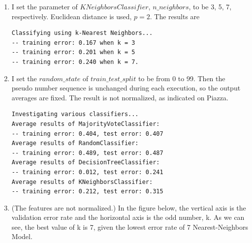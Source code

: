 \documentclass[11pt]{article}
\begin{document}
\begin{enumerate}[label=(\alph*)]
    \item
    I set the parameter of $KNeighborsClassifier$, $n\_neighbors$, to be 3, 5, 7, respectively. Euclidean distance is used, $p = 2$. The results are
    \begin{verbatim}
Classifying using k-Nearest Neighbors...
-- training error: 0.167 when k = 3
-- training error: 0.201 when k = 5
-- training error: 0.240 when k = 7.
    \end{verbatim}

    \item 
    I set the $random\_state$ of $train\_test\_split$ to be from 0 to 99. Then the pseudo number sequence is unchanged during each execution, so the output averages are fixed. The result is not normalized, as indicated on Piazza.
    \begin{verbatim}
Investigating various classifiers...
Average results of MajorityVoteClassifier:
-- training error: 0.404, test error: 0.407
Average results of RandomClassifier:
-- training error: 0.489, test error: 0.487
Average results of DecisionTreeClassifier:
-- training error: 0.012, test error: 0.241
Average results of KNeighborsClassifier:
-- training error: 0.212, test error: 0.315
    \end{verbatim}
    \newpage

    \item
    (The features are not normalized.) In the figure below, the vertical axis is the validation error rate and the horizontal axis is the odd number, k. As we can see, the best value of k is 7, given the lowest error rate of 7 Nearest-Neighbors Model.
    \\
    \newpage


\end{enumerate}
\end{document}
